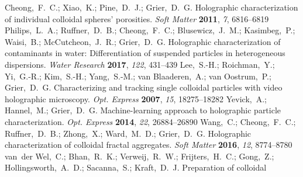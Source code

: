 \documentclass[journal=langd5,manuscript=article]{achemso}
\begin{document}
\begin{mcitethebibliography}{47}
Cheong,~F.~C.; Xiao,~K.; Pine,~D.~J.; Grier,~D.~G. Holographic characterization
  of individual colloidal spheres' porosities. \emph{Soft Matter}
  \textbf{2011}, \emph{7}, 6816--6819\relax
\mciteBstWouldAddEndPuncttrue
\mciteSetBstMidEndSepPunct{\mcitedefaultmidpunct}
{\mcitedefaultendpunct}{\mcitedefaultseppunct}\relax
\EndOfBibitem
{}
Philips,~L.~A.; Ruffner,~D.~B.; Cheong,~F.~C.; Blusewicz,~J.~M.; Kasimbeg,~P.;
  Waisi,~B.; McCutcheon,~J.~R.; Grier,~D.~G. Holographic characterization of
  contaminants in water: Differentiation of suspended particles in
  heterogeneous dispersions. \emph{Water Research} \textbf{2017}, \emph{122},
  431--439\relax
\mciteBstWouldAddEndPuncttrue
\mciteSetBstMidEndSepPunct{\mcitedefaultmidpunct}
{\mcitedefaultendpunct}{\mcitedefaultseppunct}\relax
\EndOfBibitem
{}
Lee,~S.-H.; Roichman,~Y.; Yi,~G.-R.; Kim,~S.-H.; Yang,~S.-M.; van
  Blaaderen,~A.; van Oostrum,~P.; Grier,~D.~G. Characterizing and tracking
  single colloidal particles with video holographic microscopy. \emph{Opt.
  Express} \textbf{2007}, \emph{15}, 18275--18282\relax
\mciteBstWouldAddEndPuncttrue
\mciteSetBstMidEndSepPunct{\mcitedefaultmidpunct}
{\mcitedefaultendpunct}{\mcitedefaultseppunct}\relax
\EndOfBibitem
{}
Yevick,~A.; Hannel,~M.; Grier,~D.~G. Machine-learning approach to holographic
  particle characterization. \emph{Opt. Express} \textbf{2014}, \emph{22},
  26884--26890\relax
\mciteBstWouldAddEndPuncttrue
\mciteSetBstMidEndSepPunct{\mcitedefaultmidpunct}
{\mcitedefaultendpunct}{\mcitedefaultseppunct}\relax
\EndOfBibitem
{}
Wang,~C.; Cheong,~F.~C.; Ruffner,~D.~B.; Zhong,~X.; Ward,~M.~D.; Grier,~D.~G.
  Holographic characterization of colloidal fractal aggregates. \emph{Soft
  Matter} \textbf{2016}, \emph{12}, 8774--8780\relax
\mciteBstWouldAddEndPuncttrue
\mciteSetBstMidEndSepPunct{\mcitedefaultmidpunct}
{\mcitedefaultendpunct}{\mcitedefaultseppunct}\relax
\EndOfBibitem
{}
van~der Wel,~C.; Bhan,~R.~K.; Verweij,~R.~W.; Frijters,~H.~C.; Gong,~Z.;
  Hollingsworth,~A.~D.; Sacanna,~S.; Kraft,~D.~J. Preparation of colloidal

\end{mcitethebibliography}
\end{document}
